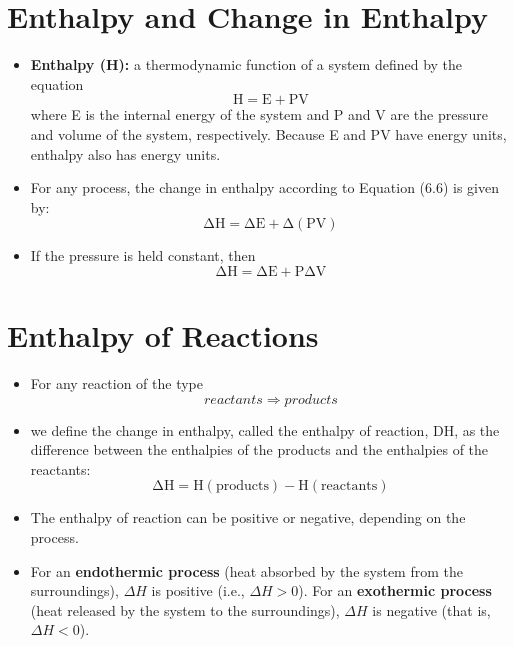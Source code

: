 \documentclass[a4paper,12pt,twocolumn]{article}
\begin{document}
\section{Enthalpy and Change in Enthalpy}
\begin{itemize}

\item \textbf{Enthalpy (H):} a thermodynamic function of a system defined by the equation
$$\mathrm{ H = E + PV}$$
where E is the internal energy of the system and P and V are the pressure and volume of the system, respectively. Because E and PV have energy units, enthalpy also has energy units.
\item For any process, the change in enthalpy according to Equation (6.6) is given by:
$$\mathrm{ \Delta H = \Delta E + \Delta (PV)}$$
\item If the pressure is held constant, then
$$\mathrm{ \Delta H = \Delta E + P \Delta V}$$
\end{itemize}

\section{Enthalpy of Reactions}
\begin{itemize}
\item For any reaction of the type
$$ reactants \Longrightarrow products$$
\item we define the change in enthalpy, called the enthalpy of reaction, DH, as the difference between the enthalpies of the products and the enthalpies of the reactants:
$$\mathrm{\Delta H = H(products) - H(reactants)}$$
\item The enthalpy of reaction can be positive or negative, depending on the process.
\item For an \textbf{endothermic process} (heat absorbed by the system from the surroundings), $\Delta H$ is positive (i.e., $\Delta H > 0$). For an \textbf{exothermic process} (heat released by the system to the surroundings), $\Delta H$ is negative (that is, $\Delta H < 0$).
\end{itemize}
\end{document}
